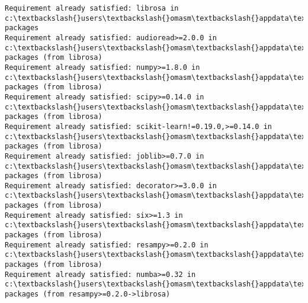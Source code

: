 \documentclass[11pt]{article}
\begin{document}
    \begin{Verbatim}[commandchars=\\\{\}]
Requirement already satisfied: librosa in c:\textbackslash{}users\textbackslash{}omasm\textbackslash{}appdata\textbackslash{}local\textbackslash{}programs\textbackslash{}python\textbackslash{}python36\textbackslash{}lib\textbackslash{}site-packages
Requirement already satisfied: audioread>=2.0.0 in c:\textbackslash{}users\textbackslash{}omasm\textbackslash{}appdata\textbackslash{}local\textbackslash{}programs\textbackslash{}python\textbackslash{}python36\textbackslash{}lib\textbackslash{}site-packages (from librosa)
Requirement already satisfied: numpy>=1.8.0 in c:\textbackslash{}users\textbackslash{}omasm\textbackslash{}appdata\textbackslash{}local\textbackslash{}programs\textbackslash{}python\textbackslash{}python36\textbackslash{}lib\textbackslash{}site-packages (from librosa)
Requirement already satisfied: scipy>=0.14.0 in c:\textbackslash{}users\textbackslash{}omasm\textbackslash{}appdata\textbackslash{}local\textbackslash{}programs\textbackslash{}python\textbackslash{}python36\textbackslash{}lib\textbackslash{}site-packages (from librosa)
Requirement already satisfied: scikit-learn!=0.19.0,>=0.14.0 in c:\textbackslash{}users\textbackslash{}omasm\textbackslash{}appdata\textbackslash{}local\textbackslash{}programs\textbackslash{}python\textbackslash{}python36\textbackslash{}lib\textbackslash{}site-packages (from librosa)
Requirement already satisfied: joblib>=0.7.0 in c:\textbackslash{}users\textbackslash{}omasm\textbackslash{}appdata\textbackslash{}local\textbackslash{}programs\textbackslash{}python\textbackslash{}python36\textbackslash{}lib\textbackslash{}site-packages (from librosa)
Requirement already satisfied: decorator>=3.0.0 in c:\textbackslash{}users\textbackslash{}omasm\textbackslash{}appdata\textbackslash{}local\textbackslash{}programs\textbackslash{}python\textbackslash{}python36\textbackslash{}lib\textbackslash{}site-packages (from librosa)
Requirement already satisfied: six>=1.3 in c:\textbackslash{}users\textbackslash{}omasm\textbackslash{}appdata\textbackslash{}local\textbackslash{}programs\textbackslash{}python\textbackslash{}python36\textbackslash{}lib\textbackslash{}site-packages (from librosa)
Requirement already satisfied: resampy>=0.2.0 in c:\textbackslash{}users\textbackslash{}omasm\textbackslash{}appdata\textbackslash{}local\textbackslash{}programs\textbackslash{}python\textbackslash{}python36\textbackslash{}lib\textbackslash{}site-packages (from librosa)
Requirement already satisfied: numba>=0.32 in c:\textbackslash{}users\textbackslash{}omasm\textbackslash{}appdata\textbackslash{}local\textbackslash{}programs\textbackslash{}python\textbackslash{}python36\textbackslash{}lib\textbackslash{}site-packages (from resampy>=0.2.0->librosa)

\end{Verbatim}
\end{document}

